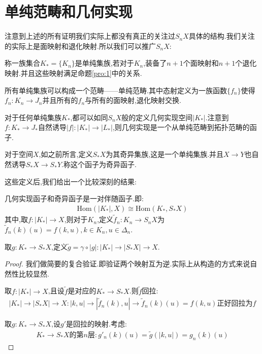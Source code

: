 \section{单纯范畴和几何实现}
注意到上述的所有证明我们实际上都没有真正的关注过$S_nX$具体的结构.我们关注的实际上是面映射和退化映射.所以我们可以推广$S_nX$:
\begin{definition}
    称一族集合$K_*=\{K_n\}$是单纯集族,若对于$K_n$,装备了$n+1$个面映射和$n+1$个退化映射.并且这些映射满足命题\ref{pro:1}中的关系.
\end{definition}
\begin{definition}[单纯范畴]
    所有单纯集族可以构成一个范畴——单纯范畴.其中态射定义为一族函数$\{f_n\}$使得$f_n:K_n \to J_n$并且所有的$f_n$与所有的面映射,退化映射交换.
\end{definition}
\begin{definition}[几何实现函子与奇异函子]
    对于任何单纯集族$K_*$,都可以如同$S_n X$般的定义几何实现空间$|K_*|$.注意到$f:K_* \to J_*$自然诱导$|f|:|K_*| \to |L_*|$,则几何实现是一个从单纯范畴到拓扑范畴的函子.

    对于空间$X$,如之前所言,定义$S_*X$为其奇异集族,这是一个单纯集族.并且$X \to Y$也自然诱导$S_*X \to S_* Y$.称这个函子为奇异函子.
\end{definition}

这些定义后,我们给出一个比较深刻的结果:
\begin{theorem}
    几何实现函子和奇异函子是一对伴随函子.即:
    \begin{align*}
        \mathrm{Hom}(|K_*|,X) \cong \mathrm{Hom}(K_*,S_*X)
    \end{align*}
    其中,取$f:|K_*| \to X$,则对于$K_n$,定义$\tilde{f}_n:K_n \to S_nX$为$\tilde{f}_n(k)(u)=f(k,u),k \in K_n, u \in \Delta_n$.

    取$g:K_* \to S_*X$,定义$\tilde{g}=\gamma\circ |g|: |K_*| \to |S_*X| \to X$.
\end{theorem}
\begin{proof}
    我们做简要的复合验证.即验证两个映射互为逆.实际上从构造的方式来说自然性比较显然.

    取$f:|K_*| \to X$,且设$\tilde{f}$是对应的$K_* \to S_*X$.则$\tilde{f}$回拉:
    \begin{align*}
        |K_*| \to |S_*X| \to X: |k,u| \to |\tilde{f}_n(k),u| \to \tilde{f}_n(k)(u)=f(k,u) \text{正好回拉为}f
    \end{align*}

    取$g:K_* \to S_*X$,设$g'$是回拉的映射.考虑:
    \begin{align*}
        K_* \to S_*X \text{的第}n\text{层}: g'_n(k)(u)=\tilde{g}(|k,u|)=g_n(k)(u) 
    \end{align*}
\end{proof}

